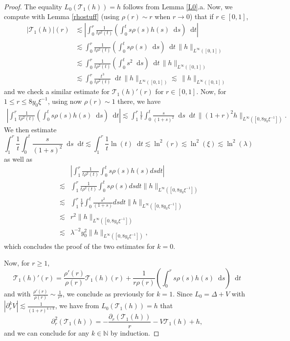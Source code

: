 \documentclass[11 pt]{amsart}
\theoremstyle{definition}
\theoremstyle{remark}
\numberwithin{equation}{section}
\newcommand{\dd}{\mathop{}\!\mathrm{d}}
\begin{document}
\begin{proof}
  The equality $L_0 (\mathcal{T}_1 (h)) = h$ follows from Lemma \ref{L0}.a. Now, we compute with Lemma \ref{rhostuff} (using $\rho (r) \sim r$ when $r
  \rightarrow 0$) that if $r \in [0, 1]$,
  \begin{align*}
    | \mathcal{T}_1 (h) | (r) & \lesssim \left| \int_0^r \frac{1}{t \rho^2
    (t)} \left( \int_0^t s \rho (s) h (s) \dd s\right)\dd t \right|\\
    & \lesssim \int_0^r \frac{1}{t \rho^2 (t)} \left( \int_0^t s \rho (s)
    \dd s\right)\dd t\, \| h \|_{L^{\infty} ([0, 1])}\\
    & \lesssim \int_0^r \frac{1}{t \rho^2 (t)} \left( \int_0^t s^2\dd s
    \right)\dd t \,\| h \|_{L^{\infty} ([0, 1])}\\
    & \lesssim \int_0^r \frac{t^3}{t \rho^2 (t)}\dd t \, \| h \|_{L^{\infty}
    ([0, 1])}  \lesssim\, \| h \|_{L^{\infty} ([0, 1])}
  \end{align*}
  and we check a similar estimate for $\mathcal{T}_1 (h)' (r)$ for $r \in [0,
  1]$. Now, for $1 \leq r \leq 8 y_0 \xi^{- 1}$, using now $\rho (r)
  \sim 1$ there, we have
  \begin{eqnarray*}
\left| \int_1^r \frac{1}{t \rho^2 (t)} \left( \int_0^t s \rho (s) h
    (s) \dd s\right)\dd t \right| \lesssim \int_1^r \frac{1}{t} \int_0^t \frac{s}{(1 + s)^{2}}\dd s
   \dd t \, \| (1 + r)^{2} h \|_{L^{\infty} ([0, 8 y_0 \xi^{- 1}])} .
  \end{eqnarray*}
We then estimate
  \[ \int_1^r \frac{1}{t} \int_0^t \frac{s}{(1 + s)^2} \dd s \dd t \lesssim
     \int_1^r \frac{1}{t} \ln (t)\dd t \lesssim \ln^2 (r) \lesssim \ln^2 (\xi)
     \lesssim \ln^2 (\lambda) \]
as well as
\begin{eqnarray*}
  &  & \left| \int_1^r \frac{1}{t \rho^2 (t)} \int_0^t s \rho (s) h (s) d s d
  t \right|\\
  & \lesssim & \int_1^r \frac{1}{t \rho^2 (t)} \int_0^t s \rho (s) d s d t \|
  h \|_{L^{\infty} ([0, 8 y_0 \xi^{- 1}])}\\
  & \lesssim & \int_1^r \frac{1}{t} \int_0^t \frac{s^2}{(1 + s)} d s d t \| h
  \|_{L^{\infty} ([0, 8 y_0 \xi^{- 1}])}\\
  & \lesssim & r^2 \| h \|_{L^{\infty} ([0, 8 y_0 \xi^{- 1}])}\\
  & \lesssim & \lambda^{- 2} y_0^2 \| h \|_{L^{\infty} ([0, 8 y_0 \xi^{- 1}])},
\end{eqnarray*}
  which concludes the proof of the two estimates for $k = 0$.
  
  Now, for $r \geqslant 1$,
  \[ \mathcal{T}_1 (h)' (r) = \frac{\rho' (r)}{\rho (r)} \mathcal{T}_1 (h) (r)
     + \frac{1}{r \rho (r)} \left( \int_0^r s \rho (s) h (s) \dd s\right)\dd t
  \]
  and with $\frac{\rho' (r)}{\rho (r)} \sim \frac{1}{r^3}$, we conclude as
  previously for $k = 1$. Since $L_0 = \Delta + V$ with $| \partial_r^k V |
  \lesssim \frac{1}{(1 + r)^{4 + k}}$, we have from $L_0 (\mathcal{T}_1 (h)) =
  h$ that
  \[ \partial_r^2 (\mathcal{T}_1 (h)) = - \frac{\partial_r (\mathcal{T}_1
     (h))}{r} - V\mathcal{T}_1 (h) + h, \]
  and we can conclude for any $k \in \mathbb{N}$ by induction.
\end{proof}
\end{document}
